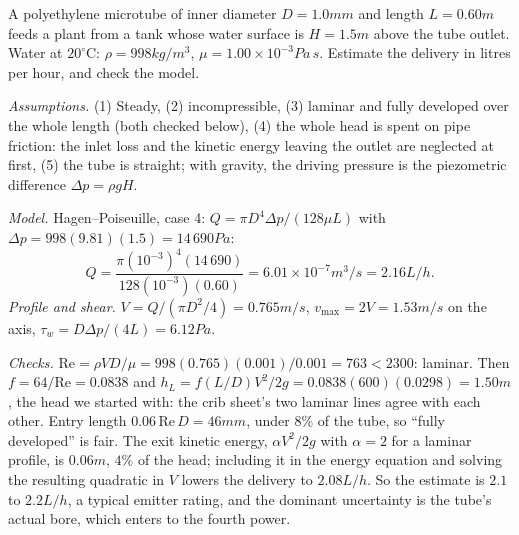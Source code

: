 \begin{example}
A polyethylene microtube of inner diameter $D = 1.0\unit{mm}$ and length $L = 0.60\unit{m}$ feeds a plant from a tank whose water surface is $H = 1.5\unit{m}$ above the tube outlet. Water at $20^\circ\mathrm{C}$: $\rho = 998\unit{kg/m^3}$, $\mu = 1.00\times10^{-3}\unit{Pa\,s}$. Estimate the delivery in litres per hour, and check the model.

\emph{Assumptions.} (1) Steady, (2) incompressible, (3) laminar and fully developed over the whole length (both checked below), (4) the whole head is spent on pipe friction: the inlet loss and the kinetic energy leaving the outlet are neglected at first, (5) the tube is straight; with gravity, the driving pressure is the piezometric difference $\Delta p = \rho g H$.

\emph{Model.} Hagen--Poiseuille, case 4: $Q = \pi D^4\Delta p/(128\mu L)$ with $\Delta p = 998(9.81)(1.5) = 14\,690\unit{Pa}$:
\[
Q = \frac{\pi(10^{-3})^4(14\,690)}{128(10^{-3})(0.60)} = 6.01\times10^{-7}\unit{m^3/s} = 2.16\unit{L/h}.
\]
\emph{Profile and shear.} $V = Q/(\pi D^2/4) = 0.765\unit{m/s}$, $v_{\max} = 2V = 1.53\unit{m/s}$ on the axis, $\tau_w = D\Delta p/(4L) = 6.12\unit{Pa}$.

\emph{Checks.} $\text{Re} = \rho VD/\mu = 998(0.765)(0.001)/0.001 = 763 < 2300$: laminar. Then $f = 64/\text{Re} = 0.0838$ and $h_L = f(L/D)V^2/2g = 0.0838(600)(0.0298) = 1.50\unit{m}$, the head we started with: the crib sheet's two laminar lines agree with each other. Entry length $0.06\,\text{Re}\,D = 46\unit{mm}$, under $8\%$ of the tube, so ``fully developed'' is fair. The exit kinetic energy, $\alpha V^2/2g$ with $\alpha = 2$ for a laminar profile, is $0.06\unit{m}$, $4\%$ of the head; including it in the energy equation and solving the resulting quadratic in $V$ lowers the delivery to $2.08\unit{L/h}$. So the estimate is $2.1$ to $2.2\unit{L/h}$, a typical emitter rating, and the dominant uncertainty is the tube's actual bore, which enters to the fourth power.
\end{example}

